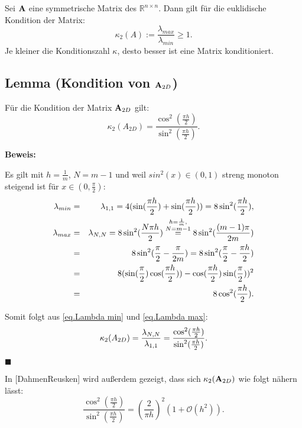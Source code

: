 Sei ${\textbf{A}}$ eine symmetrische Matrix des $\mathbb{R}^{n \times n}$. Dann gilt für die euklidische Kondition der Matrix:
\begin{equation}
\kappa_{2} (A) := \frac {\lambda_{max}} {\lambda_{min}} \ge 1.\label{eq.Kondition}
\end{equation}
Je kleiner die Konditionszahl $\kappa$, desto besser ist eine Matrix konditioniert.

\subsection{Lemma (Kondition von ${\textbf{A}}_{2D}$)}\label{ss.Matrixkondition}

Für die Kondition der Matrix ${\textbf{A}}_{2D}$ gilt:
\begin{equation}
\kappa_{2} (A_{2D}) = \frac {\cos^{2}(\frac{\pi h}{2})} {\sin^{2}(\frac{\pi h}{2})}.
\end{equation}

\textbf{Beweis:}

Es gilt mit $h = \frac{1}{m}$, $N = m - 1$ und weil $sin^{2}(x) \in (0,1)$ streng monoton steigend ist für $x \in (0,\frac{\pi}{2})$:
\begin{eqnarray}
\lambda_{min} &=& \lambda_{1,1} = 4 (\sin(\frac{\pi h}{2}) + \sin(\frac{\pi h}{2})) = 8\sin^{2}(\frac{\pi h}{2}),\label{eq.Lambda min}\\
\lambda_{max} &=& \lambda_{N,N} = 8\sin^{2}(\frac{N\pi h}{2}) \overset{\substack{h=\frac {1} {m}, \\N=m-1}}{=} 8\sin^{2}(\frac{(m-1)\pi}{2m}) \notag \\
&=& 8\sin^{2}(\frac{\pi}{2} - \frac{\pi}{2m}) = 8\sin^{2}(\frac{\pi}{2} - \frac{\pi h}{2}) \notag \\
&=& 8(\sin(\frac{\pi}{2})\cos(\frac{\pi h}{2})) - \cos(\frac{\pi h}{2})\sin(\frac{\pi}{2}))^{2} \notag \\
&=& 8\cos^{2}(\frac{\pi h}{2}). \label{eq.Lambda max}
\end{eqnarray}

Somit folgt aus \autoref{eq.Lambda min} und \autoref{eq.Lambda max}:
\begin{equation}
\kappa_{2} (A_{2D}) = \frac {\lambda_{N,N}} {\lambda_{1,1}} = \frac {\cos^{2} (\frac {\pi h} {2})} {\sin^{2} (\frac {\pi h} {2})}. \notag
\end{equation}
\begin{flushright}
$\blacksquare$
\end{flushright}
In [DahmenReusken] wird außerdem gezeigt, dass sich $\kappa_{2}({\textbf{A}}_{2D})$ wie folgt nähern lässt:
\begin{equation}
\frac {\cos^{2} (\frac {\pi h} {2})} {\sin^{2} (\frac {\pi h} {2})} = \left( \frac {2} {\pi h} \right)^{2} (1 + \mathcal{O}(h^{2})).
\end{equation}

